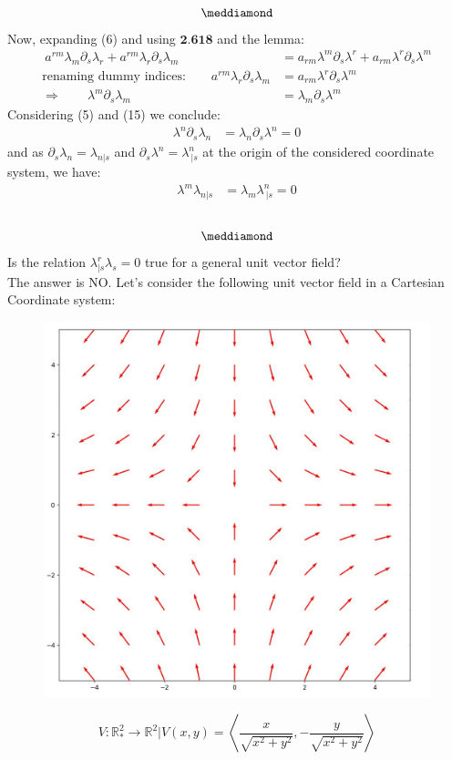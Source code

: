 $$\meddiamond$$
Now, expanding (6) and using $\textbf{2.618}$ and the lemma:
\begin{align}
\ a^{rm}\lambda_m\partial_s \lambda_r+ a^{rm} \lambda_r \partial_s \lambda_m &= a_{rm} \lambda^m \partial_s \lambda^r + a_{rm} \lambda^r \partial_s \lambda^m\\
\text{renaming dummy indices:}\quad\quad   a^{rm} \lambda_r \partial_s \lambda_m &= a_{rm} \lambda^r \partial_s \lambda^m \\
\Rightarrow\quad\quad \lambda^m \partial_s \lambda_m &= \lambda_m \partial_s \lambda^m
\end{align}
Considering (5) and (15) we conclude:
\begin{align}
\lambda^n \partial_s \lambda_n &= \lambda_n \partial_s \lambda^n = 0
\end{align}
and as $\partial_s \lambda_n = \lambda_{n|s} $ and $\partial_s \lambda^n = \lambda^n_{\ |s} $ at the origin of the considered coordinate system, we have:
\begin{align}
\lambda^m \lambda_{n|s} &= \lambda_m \lambda^n_{\ |s} = 0
\end{align}\\
$$\meddiamond$$
Is the relation $\lambda^r_{|s}\lambda_s = 0$ true for a general unit vector field?\\
The answer is NO. Let's consider the following unit vector field in a Cartesian Coordinate system:
\begin{figure}[H]
\centering
\begin{minipage}[H]{.4\textwidth}
\vspace{0pt}
\includegraphics[scale=.3]{unitvectorfield1.jpg}
\end{minipage}\hfill
\begin{minipage}[H]{0.4\textwidth}
\vspace{50pt}
$$V:\mathbb{R}_*^2\rightarrow \mathbb{R}^2|V(x,y) = \left< \frac{x}{\sqrt{x^2+y^2}},-\frac{y}{\sqrt{x^2+y^2}} \right>$$
\end{minipage}
\end{figure}
